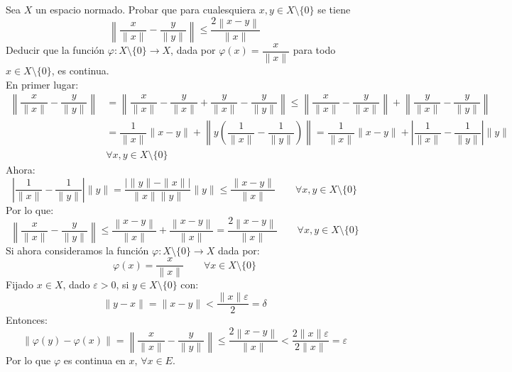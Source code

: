 \begin{ejercicio}\label{ej:rel4_11}
Sea \( X \) un espacio normado. Probar que para cualesquiera \( x, y \in X \setminus \{0\} \) se tiene
\[
    \left\| \frac{x}{\|x\|} - \frac{y}{\|y\|} \right\| \leq \frac{2\left\| x - y \right\|}{\|x\|}
\]
Deducir que la función \( \varphi : X \setminus \{0\} \rightarrow X \), dada por \( \varphi(x) = \dfrac{x}{\|x\|} \) para todo \( x \in X \setminus \{0\} \), es continua.\\

\noindent
En primer lugar:
\begin{align*}
    \left\|\dfrac{x}{\|x\|}-\dfrac{y}{\|y\|}\right\| &= \left\|\dfrac{x}{\|x\|} - \dfrac{y}{\|x\|} + \dfrac{y}{\|x\|}-\dfrac{y}{\|y\|}\right\| \leq \left\|\dfrac{x}{\|x\|} - \dfrac{y}{\|x\|}\right\| +\left\| \dfrac{y}{\|x\|}-\dfrac{y}{\|y\|}\right\| \\
                                                     &= \dfrac{1}{\|x\|} \|x-y\| + \left\| y\left(\dfrac{1}{\|x\|}-\dfrac{1}{\|y\|}\right)\right\| = \dfrac{1}{\|x\|} \|x-y\| +\left| \dfrac{1}{\|x\|}-\dfrac{1}{\|y\|}\right| \|y\| \\
                                                     & \forall x,y\in X\setminus \{0\}
\end{align*}
Ahora:
\begin{equation*}
    \left| \dfrac{1}{\|x\|}-\dfrac{1}{\|y\|}\right| \|y\|  = \dfrac{|\|y\|-\|x\||}{\|x\|\|y\|} \|y\|  \leq \dfrac{\|x-y\|}{\|x\|} \qquad \forall x,y\in X\setminus \{0\}
\end{equation*}
Por lo que:
\begin{equation*}
    \left\| \frac{x}{\|x\|} - \frac{y}{\|y\|} \right\| \leq \frac{\left\| x - y \right\|}{\|x\|} + \frac{\left\| x - y \right\|}{\|x\|} = \frac{2\left\| x - y \right\|}{\|x\|} \qquad  \forall x,y\in X\setminus \{0\}
\end{equation*}
Si ahora consideramos la función $\varphi:X\setminus \{0\}\to X$ dada por:
\begin{equation*}
    \varphi(x) = \dfrac{x}{\|x\|} \qquad \forall x\in X\setminus \{0\}
\end{equation*}
Fijado $x\in X$, dado $\varepsilon>0$, si $y\in X\setminus\{0\}$ con:
\begin{equation*}
    \|y-x\| = \|x-y\| < \dfrac{\|x\|\varepsilon}{2} = \delta
\end{equation*}
Entonces:
\begin{equation*}
    \|\varphi(y) - \varphi(x)\| = \left\| \frac{x}{\|x\|} - \frac{y}{\|y\|} \right\|\leq \frac{2\left\| x - y \right\|}{\|x\|} < \frac{2\|x\|\varepsilon}{2\|x\|} =  \varepsilon
\end{equation*}
Por lo que $\varphi$ es continua en $x$, $\forall x\in E$.
\end{ejercicio}

